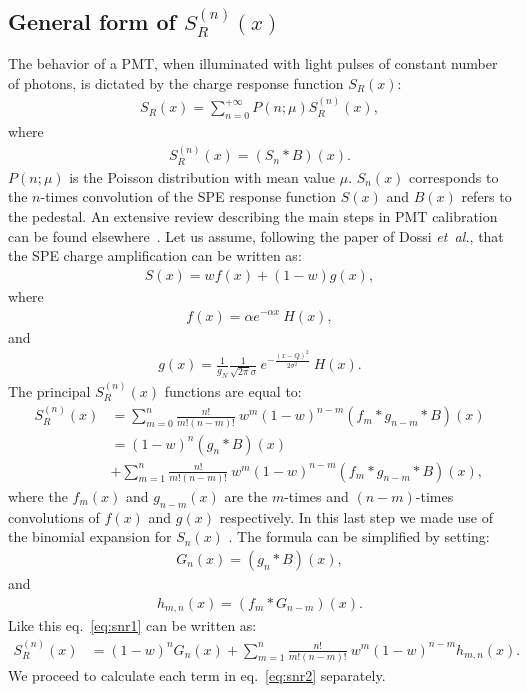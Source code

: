 \documentclass[preprint,12pt]{elsarticle}
\begin{document}
\subsection{General form of   $S^{(n)}_R(x)$ }
%

The behavior of a PMT, when illuminated with light pulses of constant number of photons, is dictated by the charge response function $S_R(x)$:
\begin{align}
S_R(x) = \sum_{n=0}^{+\infty} P(n;\mu) S^{(n)}_R(x), \label{eq:SR}
\end{align}
where 
\begin{align}
S^{(n)}_R(x) = (S_n*B)(x). 
\end{align}
$ P(n;\mu)$ is the Poisson distribution with mean value $\mu$. 
$S_n(x)$ corresponds to the $n$-times convolution of the SPE response function $S(x)$ and $B(x)$ refers to the pedestal. 
An extensive review describing the main steps in PMT calibration can be found elsewhere~\cite{me}. 
Let us assume, following the paper of Dossi \emph{et~al.}, that the SPE charge amplification can be written as:
\begin{align}
S(x) = w f(x) + (1-w)g(x), \label{eq:S}
\end{align}
where 
\begin{align}
f(x) = \alpha e^{-\alpha x } \ H(x),
\end{align}
and
\begin{align}
g(x) = \frac{1}{g_N} \frac{1}{\sqrt{2\pi}\sigma} \ e^{ - \frac{( x - Q )^2}{2\sigma^2}} \ H(x). 
\end{align}
The principal $S^{(n)}_R(x)$ functions are equal to: %
\begin{align}
S^{(n)}_R(x) & = \sum_{m=0}^{n}  \frac{n!}{m!(n-m)!} \ w^m (1-w)^{n-m} (f_m*g_{n-m} *B )(x)\nonumber \\
                     & = (1-w)^n (g_{n} *B )(x) \nonumber \\
                    & + \sum_{m=1}^{n}  \frac{n!}{m!(n-m)!} \ w^m (1-w)^{n-m} (f_m*g_{n-m} *B )(x), \label{eq:snr1}
\end{align}
where the $f_m(x)$ and $g_{n-m}(x)$ are the $m$-times and $(n-m)$-times convolutions of $f(x)$ and $g(x)$ respectively. 
In this last step we made use of the binomial expansion for $S_n(x)$ \cite{error}. 
The formula can be simplified by setting:
\begin{align}
G_n(x) = (g_{n} *B )(x), 
\end{align}
and 
\begin{align}
h_{m,n}(x) = (f_{m} * G_{n-m} )(x).  
\end{align}
Like this eq.~\eqref{eq:snr1} can be written as:
\begin{align}
S^{(n)}_R(x) & = (1-w)^n G_n(x) + \sum_{m=1}^{n}  \frac{n!}{m!(n-m)!} \ w^m (1-w)^{n-m} h_{m,n}(x). \label{eq:snr2}
\end{align}
We proceed to calculate each term in eq.~\eqref{eq:snr2} separately.  
\end{document}
